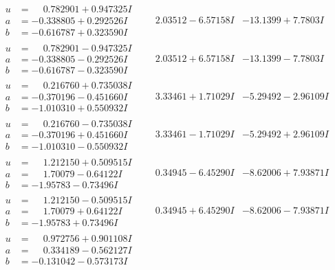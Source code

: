 \documentclass[1p]{elsarticle_modified}
\theoremstyle{definition}
\begin{document}
$$\begin{array}{c|c|c}
\begin{aligned}
u &= \phantom{-}0.782901 + 0.947325 I \\
a &= -0.338805 + 0.292526 I \\
b &= -0.616787 + 0.323590 I\end{aligned}
 & \phantom{-}2.03512 - 6.57158 I & -13.1399 + 7.7803 I \\ \hline\begin{aligned}
u &= \phantom{-}0.782901 - 0.947325 I \\
a &= -0.338805 - 0.292526 I \\
b &= -0.616787 - 0.323590 I\end{aligned}
 & \phantom{-}2.03512 + 6.57158 I & -13.1399 - 7.7803 I \\ \hline\begin{aligned}
u &= \phantom{-}0.216760 + 0.735038 I \\
a &= -0.370196 - 0.451660 I \\
b &= -1.010310 + 0.550932 I\end{aligned}
 & \phantom{-}3.33461 + 1.71029 I & -5.29492 - 2.96109 I \\ \hline\begin{aligned}
u &= \phantom{-}0.216760 - 0.735038 I \\
a &= -0.370196 + 0.451660 I \\
b &= -1.010310 - 0.550932 I\end{aligned}
 & \phantom{-}3.33461 - 1.71029 I & -5.29492 + 2.96109 I \\ \hline\begin{aligned}
u &= \phantom{-}1.212150 + 0.509515 I \\
a &= \phantom{-}1.70079 - 0.64122 I \\
b &= -1.95783 - 0.73496 I\end{aligned}
 & \phantom{-}0.34945 - 6.45290 I & -8.62006 + 7.93871 I \\ \hline\begin{aligned}
u &= \phantom{-}1.212150 - 0.509515 I \\
a &= \phantom{-}1.70079 + 0.64122 I \\
b &= -1.95783 + 0.73496 I\end{aligned}
 & \phantom{-}0.34945 + 6.45290 I & -8.62006 - 7.93871 I \\ \hline\begin{aligned}
u &= \phantom{-}0.972756 + 0.901108 I \\
a &= \phantom{-}0.334189 - 0.562127 I \\
b &= -0.131042 - 0.573173 I\end{aligned}

\end{array}$$
\end{document}
